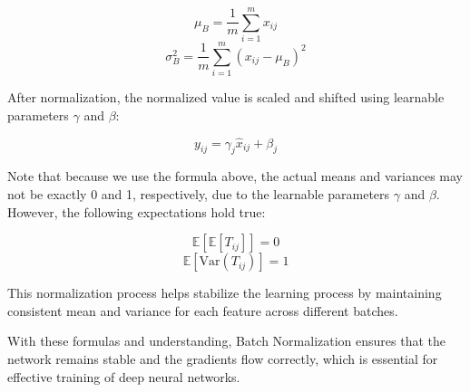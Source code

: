 \documentclass[12pt]{article}
\begin{document}
\[ \mu_B = \frac{1}{m} \sum_{i=1}^m x_{ij} \]
\[ \sigma_B^2 = \frac{1}{m} \sum_{i=1}^m (x_{ij} - \mu_B)^2 \]

After normalization, the normalized value is scaled and shifted using learnable parameters \( \gamma \) and \( \beta \):

\[ y_{ij} = \gamma_j \hat{x}_{ij} + \beta_j \]

Note that because we use the formula above, the actual means and variances may not be exactly 0 and 1, respectively, due to the learnable parameters \( \gamma \) and \( \beta \). However, the following expectations hold true:

\[ \mathbb{E}[\mathbb{E}[T_{ij}]] = 0 \]
\[ \mathbb{E}[\text{Var}(T_{ij})] = 1 \]

This normalization process helps stabilize the learning process by maintaining consistent mean and variance for each feature across different batches.

With these formulas and understanding, Batch Normalization ensures that the network remains stable and the gradients flow correctly, which is essential for effective training of deep neural networks.
\end{document}
